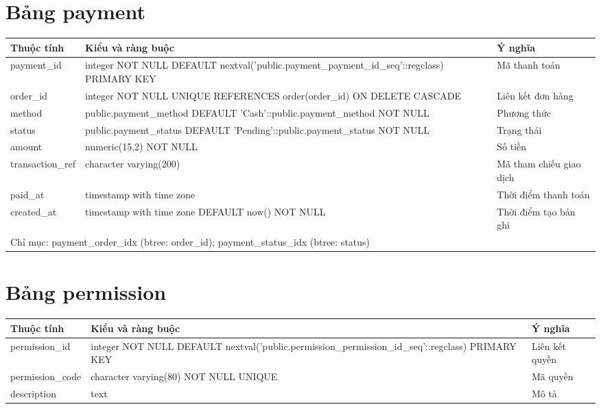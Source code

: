 \section{Bảng payment}
\begin{longtable}{|p{}|p{}|p{}|}\hline
\textbf{Thuộc tính}&\textbf{Kiểu và ràng buộc}&\textbf{Ý nghĩa}\\\hline\endhead
payment\_id & integer NOT NULL DEFAULT nextval('public.payment\_payment\_id\_seq'::regclass) PRIMARY KEY & Mã thanh toán\\\hline
order\_id & integer NOT NULL UNIQUE REFERENCES order(order\_id) ON DELETE CASCADE & Liên kết đơn hàng\\\hline
method & public.payment\_method DEFAULT 'Cash'::public.payment\_method NOT NULL & Phương thức\\\hline
status & public.payment\_status DEFAULT 'Pending'::public.payment\_status NOT NULL & Trạng thái\\\hline
amount & numeric(15,2) NOT NULL & Số tiền\\\hline
transaction\_ref & character varying(200) & Mã tham chiếu giao dịch\\\hline
paid\_at & timestamp with time zone & Thời điểm thanh toán\\\hline
created\_at & timestamp with time zone DEFAULT now() NOT NULL & Thời điểm tạo bản ghi\\\hline
\multicolumn{3}{|p{0.93\textwidth}|}{Chỉ mục: payment\_order\_idx (btree: order\_id); payment\_status\_idx (btree: status)}\\\hline
\end{longtable}
\normalsize
\section{Bảng permission}
\begin{longtable}{|p{}|p{}|p{}|}\hline
\textbf{Thuộc tính}&\textbf{Kiểu và ràng buộc}&\textbf{Ý nghĩa}\\\hline\endhead
permission\_id & integer NOT NULL DEFAULT nextval('public.permission\_permission\_id\_seq'::regclass) PRIMARY KEY & Liên kết quyền\\\hline
permission\_code & character varying(80) NOT NULL UNIQUE & Mã quyền\\\hline
description & text & Mô tả\\\hline
\end{longtable}
\normalsize
